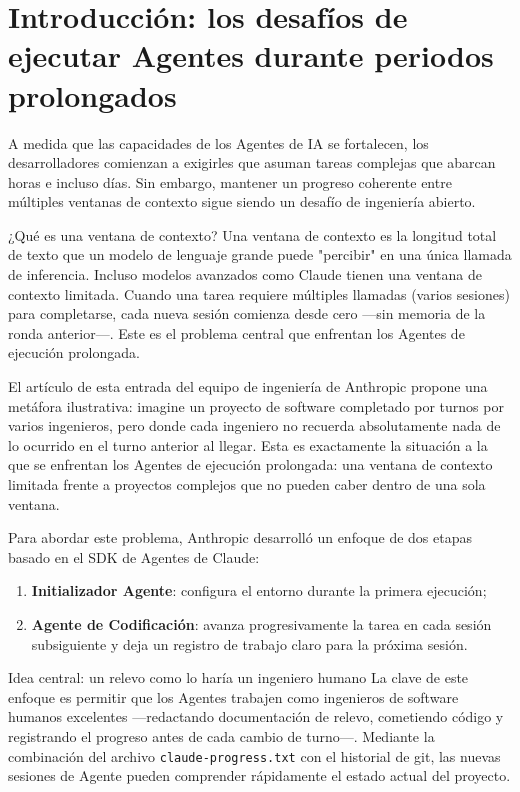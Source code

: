 \section{Introducción: los desafíos de ejecutar Agentes durante periodos prolongados}

A medida que las capacidades de los Agentes de IA se fortalecen, los desarrolladores comienzan a exigirles que asuman tareas complejas que abarcan horas e incluso días. Sin embargo, mantener un progreso coherente entre múltiples ventanas de contexto sigue siendo un desafío de ingeniería abierto.

\begin{knowledgebox}{¿Qué es una ventana de contexto?}
Una ventana de contexto es la longitud total de texto que un modelo de lenguaje grande puede "percibir" en una única llamada de inferencia. Incluso modelos avanzados como Claude tienen una ventana de contexto limitada. Cuando una tarea requiere múltiples llamadas (varios sesiones) para completarse, cada nueva sesión comienza desde cero —sin memoria de la ronda anterior—. Este es el problema central que enfrentan los Agentes de ejecución prolongada.
\end{knowledgebox}

El artículo de esta entrada del equipo de ingeniería de Anthropic propone una metáfora ilustrativa: imagine un proyecto de software completado por turnos por varios ingenieros, pero donde cada ingeniero no recuerda absolutamente nada de lo ocurrido en el turno anterior al llegar. Esta es exactamente la situación a la que se enfrentan los Agentes de ejecución prolongada: una ventana de contexto limitada frente a proyectos complejos que no pueden caber dentro de una sola ventana.

Para abordar este problema, Anthropic desarrolló un enfoque de dos etapas basado en el SDK de Agentes de Claude:
\begin{enumerate}
    \item \textbf{Initializador Agente}: configura el entorno durante la primera ejecución;
    \item \textbf{Agente de Codificación}: avanza progresivamente la tarea en cada sesión subsiguiente y deja un registro de trabajo claro para la próxima sesión.
\end{enumerate}

\begin{importantbox}{Idea central: un relevo como lo haría un ingeniero humano}
La clave de este enfoque es permitir que los Agentes trabajen como ingenieros de software humanos excelentes —redactando documentación de relevo, cometiendo código y registrando el progreso antes de cada cambio de turno—. Mediante la combinación del archivo \texttt{claude-progress.txt} con el historial de git, las nuevas sesiones de Agente pueden comprender rápidamente el estado actual del proyecto.
\end{importantbox}

